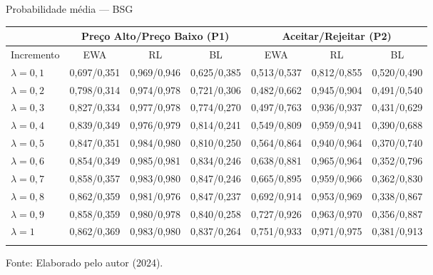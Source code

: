 \begin{tabela}[H]
	\small
	\centering
	\caption{Probabilidade média — BSG}
	\begin{tabular}{l|c c c|c c c}
		\Xhline{2\arrayrulewidth}
		& \multicolumn{3}{c|}{Preço Alto/Preço Baixo (P1)} & \multicolumn{3}{c}{Aceitar/Rejeitar (P2)} \\ 
		\hline
		Incremento & EWA & RL & BL & EWA & RL & BL \\ \hline
		$\lambda = 0,1$ & 0,697/0,351 & 0,969/0,946 & 0,625/0,385 & 0,513/0,537 & 0,812/0,855 & 0,520/0,490 \\
		$\lambda = 0,2$ & 0,798/0,314 & 0,974/0,978 & 0,721/0,306 & 0,482/0,662 & 0,945/0,904 & 0,491/0,540 \\
		$\lambda = 0,3$ & 0,827/0,334 & 0,977/0,978 & 0,774/0,270 & 0,497/0,763 & 0,936/0,937 & 0,431/0,629 \\
		$\lambda = 0,4$ & 0,839/0,349 & 0,976/0,979 & 0,814/0,241 & 0,549/0,809 & 0,959/0,941 & 0,390/0,688 \\
		$\lambda = 0,5$ & 0,847/0,351 & 0,984/0,980 & 0,810/0,250 & 0,564/0,864 & 0,940/0,964 & 0,370/0,740 \\
		$\lambda = 0,6$ & 0,854/0,349 & 0,985/0,981 & 0,834/0,246 & 0,638/0,881 & 0,965/0,964 & 0,352/0,796 \\
		$\lambda = 0,7$ & 0,858/0,357 & 0,983/0,980 & 0,847/0,246 & 0,665/0,895 & 0,959/0,966 & 0,362/0,830 \\
		$\lambda = 0,8$ & 0,862/0,359 & 0,981/0,976 & 0,847/0,237 & 0,692/0,914 & 0,953/0,969 & 0,338/0,867 \\
		$\lambda = 0,9$ & 0,858/0,359 & 0,980/0,978 & 0,840/0,258 & 0,727/0,926 & 0,963/0,970 & 0,356/0,887 \\
		$\lambda = 1$ & 0,862/0,369 & 0,983/0,980 & 0,837/0,264 & 0,751/0,933 & 0,971/0,975 & 0,381/0,913 \\
		\Xhline{2\arrayrulewidth}
	\end{tabular}
	\label{tabela_6}
	\caption*{\fontsize{10}{12}\selectfont Fonte: Elaborado pelo autor (2024).}
\end{tabela}
